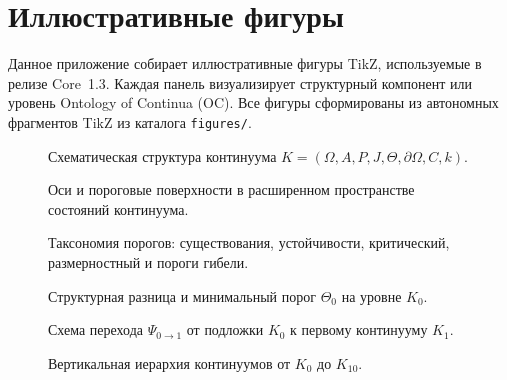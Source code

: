 
\section{Иллюстративные фигуры}
\label{sec:figures}

Данное приложение собирает иллюстративные фигуры TikZ, используемые в релизе Core~1.3.
Каждая панель визуализирует структурный компонент или уровень
Ontology of Continua (OC). Все фигуры сформированы из автономных
фрагментов TikZ из каталога \texttt{figures/}.

\begin{figure}[p]
  \centering
  
  \caption{Схематическая структура континуума
           \(K = (\Omega, A, P, J, \Theta, \partial\Omega, C, k)\).}
  \label{fig:continua-structure}
\end{figure}

\begin{figure}[p]
  \centering
  
  \caption{Оси и пороговые поверхности в расширенном пространстве состояний
           континуума.}
  \label{fig:axes-thresholds}
\end{figure}

\begin{figure}[p]
  \centering
  
  \caption{Таксономия порогов: существования, устойчивости,
           критический, размерностный и пороги гибели.}
  \label{fig:thresholds-taxonomy}
\end{figure}

\begin{figure}[p]
  \centering
  
  \caption{Структурная разница и минимальный порог
           \texorpdfstring{\(\Theta_0\)}{\Theta_0} на уровне
           \texorpdfstring{\(K_0\)}{K_0}.}
  \label{fig:delta-threshold-k0}
\end{figure}

\begin{figure}[p]
  \centering
  
  \caption{Схема перехода \(\Psi_{0\to 1}\) от подложки
           \(K_0\) к первому континууму \(K_1\).}
  \label{fig:k0-k1-transition}
\end{figure}

\begin{figure}[p]
  \centering
  
  \caption{Вертикальная иерархия континуумов от
           \texorpdfstring{\(K_0\)}{K_0} до \(K_{10}\).}
  \label{fig:levels-hierarchy}
\end{figure}


